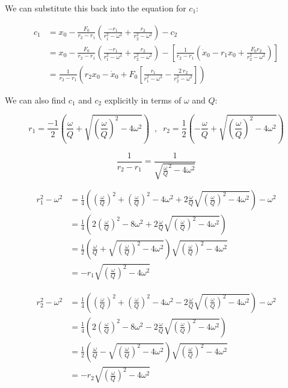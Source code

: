 We can substitute this back into the equation for $c_1$:

\begin{align*}
	c_1 &= x_0 -  \frac{F_0}{r_2 - r_1} \left(  \frac{-r_1}{r_1^2 - \omega^2} +  \frac{r_2}{r_2^2 - \omega^2}   \right) - c_2 \\
	&= x_0  -  \frac{F_0}{r_2 - r_1} \left(  \frac{-r_1}{r_1^2 - \omega^2} +  \frac{r_2}{r_2^2 - \omega^2}   \right) - \left[ \frac{1}{r_2 - r_1} \left( \dot{x}_0 - r_1 x_0 +  \frac{F_0 r_2}{r_2^2 - \omega^2} \right) \right] \\
	&= \frac{1}{r_2 - r_1} \left( r_2 x_0 -\dot{x}_0 + F_0 \left[ \frac{r_1}{r_1^2 - \omega^2} -  \frac{2 \: r_2}{r_2^2 - \omega^2} \right] \right)
\end{align*}

We can also find $c_1$ and $c_2$ explicitly in terms of $\omega$ and $Q$:

\begin{equation*}
	r_1 = \frac{-1}{2} \left( \frac{\omega}{Q} + \sqrt{\left( \frac{\omega}{Q} \right)^2 -4 \omega^2} \right) \; \; , \; \; r_2 = \frac{1}{2} \left( -\frac{\omega}{Q} + \sqrt{\left( \frac{\omega}{Q} \right)^2 -4 \omega^2} \right)
\end{equation*}

\begin{equation*}
	\frac{1}{r_2 - r_1} = \frac{1}{\sqrt{\frac{\omega}{Q}^2 - 4 \omega^2}}
\end{equation*}

\begin{align*}
	r_1^2 - \omega^2 &=  
	\frac{1}{4} \left( \left( \frac{\omega}{Q} \right)^2 + \left( \frac{\omega}{Q} \right)^2 -4 \omega^2 + 2 \frac{\omega}{Q} \sqrt{\left( \frac{\omega}{Q} \right)^2 -4 \omega^2} \right) - \omega^2 \\
	&= \frac{1}{4} \left( 2 \left( \frac{\omega}{Q} \right)^2 - 8 \omega^2 + 2 \frac{\omega}{Q} \sqrt{ \left( \frac{\omega}{Q} \right)^2 -4 \omega^2} \right) \\
	&= \frac{1}{2} \left( \frac{\omega}{Q} + \sqrt{\left( \frac{\omega}{Q} \right)^2 -4 \omega^2} \right) \sqrt{\left( \frac{\omega}{Q} \right)^2 -4 \omega^2} \\
	&= - r_1 \sqrt{\left( \frac{\omega}{Q} \right)^2 -4 \omega^2}
\end{align*}

\begin{align*}
	r_2^2 - \omega^2 &=  
	\frac{1}{4} \left( \left( \frac{\omega}{Q} \right)^2 + \left( \frac{\omega}{Q} \right)^2 -4 \omega^2 - 2 \frac{\omega}{Q} \sqrt{\left( \frac{\omega}{Q} \right)^2 -4 \omega^2} \right) - \omega^2 \\
	&= \frac{1}{4} \left( 2 \left( \frac{\omega}{Q} \right)^2 - 8 \omega^2 - 2 \frac{\omega}{Q} \sqrt{ \left( \frac{\omega}{Q} \right)^2 -4 \omega^2} \right) \\
	&= \frac{1}{2} \left( \frac{\omega}{Q} - \sqrt{\left( \frac{\omega}{Q} \right)^2 -4 \omega^2} \right) \sqrt{\left( \frac{\omega}{Q} \right)^2 -4 \omega^2} \\
	&= - r_2 \sqrt{\left( \frac{\omega}{Q} \right)^2 -4 \omega^2}
\end{align*}


